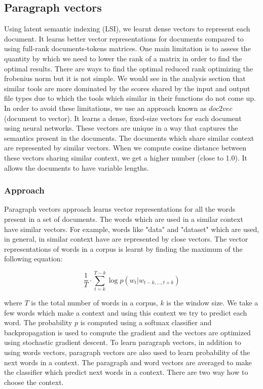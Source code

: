 \subsection{Paragraph vectors}
Using latent semantic indexing (LSI), we learnt dense vectors to represent each document. It learns better vector representations for documents compared to using full-rank documents-tokens matrices. One main limitation is to assess the quantity by which we need to lower the rank of a matrix in order to find the optimal results. There are ways to find the optimal reduced rank optimizing the frobenius norm but it is not simple. We would see in the analysis section that similar tools are more dominated by the scores shared by the input and output file types due to which the tools which similar in their functions do not come up. In order to avoid these limitations, we use an approach known as $doc2vec$ (document to vector). It learns a dense, fixed-size vectors for each document using neural networks. These vectors are unique in a way that captures the semantics present in the documents. The documents which share similar context are represented by similar vectors. When we compute cosine distance between these vectors sharing similar context, we get a higher number (close to 1.0). It allows the documents to have variable lengths.

\subsubsection{Approach}
Paragraph vectors approach learns vector representations for all the words present in a set of documents. The words which are used in a similar context have similar vectors. For example, words like "data" and "dataset" which are used, in general, in similar context have are represented by close vectors. The vector representations of words in a corpus is learnt by finding the maximum of the following equation:

\begin{equation}
\frac{1}{T} \cdot \sum_{t=k}^{T-k} \log p(w_t|w_{t-k,...,t+k})
\end{equation}

where $T$ is the total number of words in a corpus, $k$ is the window size. We take a few words which make a context and using this context we try to predict each word. The probability $p$ is computed using a softmax classifier and backpropagation is used to compute the gradient and the vectors are optimized using stochastic gradient descent. To learn paragraph vectors, in addition to using words vectors, paragraph vectors are also used to learn probability of the next words in a context. The paragraph and word vectors are averaged to make the classifier which predict next words in a context. There are two way how to choose the context. 


